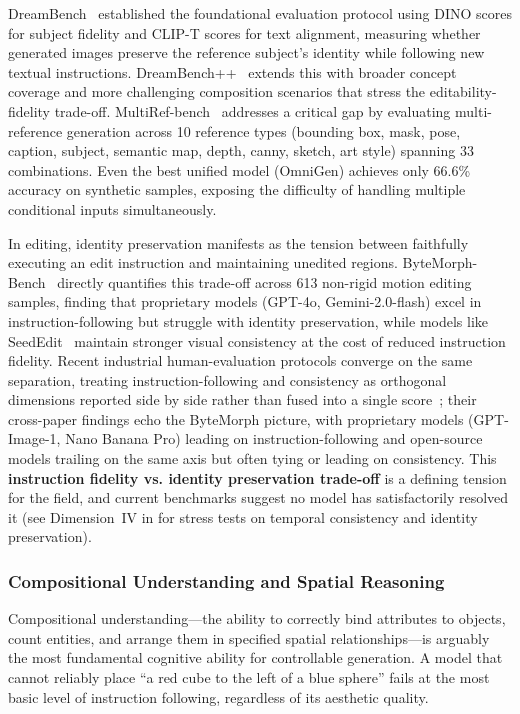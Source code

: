 \documentclass{llmxive}
\begin{document}
DreamBench~\citep{ruiz2023dreambooth} established the foundational evaluation protocol using DINO scores for subject fidelity and CLIP-T scores for text alignment, measuring whether generated images preserve the reference subject's identity while following new textual instructions. DreamBench++~\citep{peng2024dreambench++} extends this with broader concept coverage and more challenging composition scenarios that stress the editability-fidelity trade-off. MultiRef-bench~\citep{MultiRef} addresses a critical gap by evaluating multi-reference generation across 10 reference types (bounding box, mask, pose, caption, subject, semantic map, depth, canny, sketch, art style) spanning 33 combinations. Even the best unified model (OmniGen) achieves only 66.6\% accuracy on synthetic samples, exposing the difficulty of handling multiple conditional inputs simultaneously.

In editing, identity preservation manifests as the tension between faithfully executing an edit instruction and maintaining unedited regions. ByteMorph-Bench~\citep{ByteMorph} directly quantifies this trade-off across 613 non-rigid motion editing samples, finding that proprietary models (GPT-4o, Gemini-2.0-flash) excel in instruction-following but struggle with identity preservation, while models like SeedEdit~\citep{wang2025seededit} maintain stronger visual consistency at the cost of reduced instruction fidelity. Recent industrial human-evaluation protocols converge on the same separation, treating instruction-following and consistency as orthogonal dimensions reported side by side rather than fused into a single score~\citep{seedream2025seedream, team2025longcat, team2026firered, mao2026wan}; their cross-paper findings echo the ByteMorph picture, with proprietary models (GPT-Image-1, Nano Banana Pro) leading on instruction-following and open-source models trailing on the same axis but often tying or leading on consistency. This \textbf{instruction fidelity vs. identity preservation trade-off} is a defining tension for the field, and current benchmarks suggest no model has satisfactorily resolved it (see Dimension~IV in  for stress tests on temporal consistency and identity preservation).


\subsubsection{Compositional Understanding and Spatial Reasoning}

Compositional understanding---the ability to correctly bind attributes to objects, count entities, and arrange them in specified spatial relationships---is arguably the most fundamental cognitive ability for controllable generation. A model that cannot reliably place ``a red cube to the left of a blue sphere'' fails at the most basic level of instruction following, regardless of its aesthetic quality.
\end{document}

